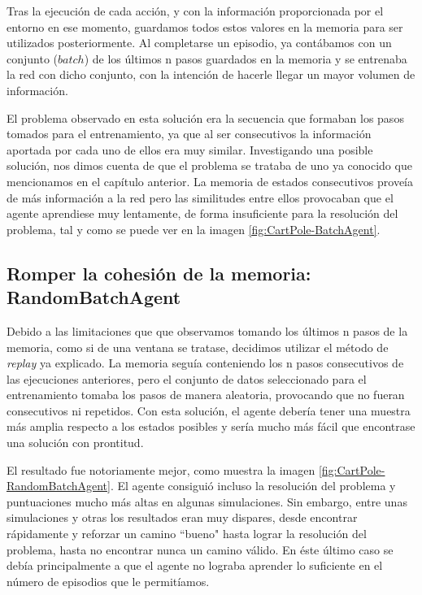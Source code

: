 Tras la ejecución de cada acción, y con la información proporcionada por el entorno en ese momento, guardamos todos estos valores en la memoria para ser utilizados posteriormente. Al completarse un episodio, ya contábamos con un conjunto ($batch$) de los últimos n pasos guardados en la memoria y se entrenaba la red con dicho conjunto, con la intención de hacerle llegar un mayor volumen de información.

El problema observado en esta solución era la secuencia que formaban los pasos tomados para el entrenamiento, ya que al ser consecutivos la información aportada por cada uno de ellos era muy similar. Investigando una posible solución, nos dimos cuenta de que el problema se trataba de uno ya conocido que mencionamos en el capítulo anterior. La memoria de estados consecutivos proveía de más información a la red pero las similitudes entre ellos provocaban que el agente aprendiese muy lentamente, de forma insuficiente para la resolución del problema, tal y como se puede ver en la imagen \ref{fig:CartPole-BatchAgent}.


\subsection{Romper la cohesión de la memoria: RandomBatchAgent}

Debido a las limitaciones que que observamos tomando los últimos n pasos de la memoria, como si de una ventana se tratase, decidimos utilizar el método de \textit{replay} ya explicado. La memoria seguía conteniendo los n pasos consecutivos de las ejecuciones anteriores, pero el conjunto de datos seleccionado para el entrenamiento tomaba los pasos de manera aleatoria, provocando que no fueran consecutivos ni repetidos. Con esta solución, el agente debería tener una muestra más amplia respecto a los estados posibles y sería mucho más fácil que encontrase una solución con prontitud.

El resultado fue notoriamente mejor, como muestra la imagen \ref{fig:CartPole-RandomBatchAgent}. El agente consiguió incluso la resolución del problema y puntuaciones mucho más altas en algunas simulaciones. Sin embargo, entre unas simulaciones y otras los resultados eran muy dispares, desde encontrar rápidamente y reforzar un camino ``bueno" hasta lograr la resolución del problema, hasta no encontrar nunca un camino válido. En éste último caso se debía principalmente a que el agente no lograba aprender lo suficiente en el número de episodios que le permitíamos.

